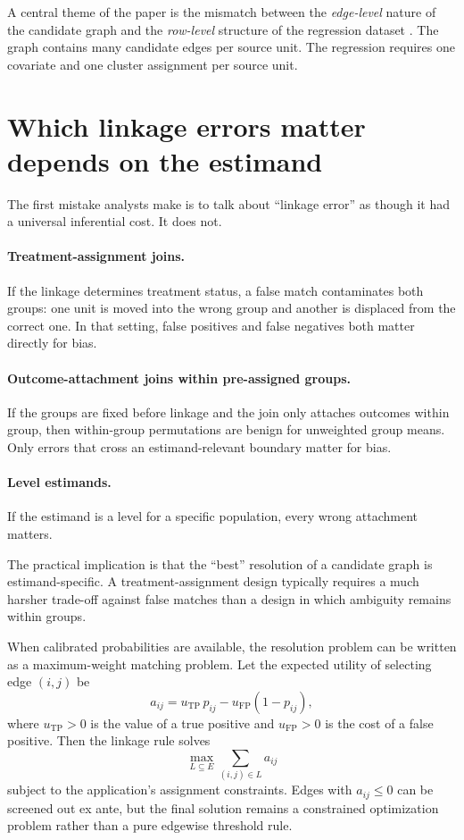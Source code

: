 \documentclass[12pt]{article}
\theoremstyle{remark}
\begin{document}
A central theme of the paper is the mismatch between the \emph{edge-level} nature of the candidate graph and the \emph{row-level} structure of the regression dataset \citep[see][for a general treatment of this mismatch]{sood2025selection}. The graph contains many candidate edges per source unit. The regression requires one covariate and one cluster assignment per source unit.

\section{Which linkage errors matter depends on the estimand}

The first mistake analysts make is to talk about ``linkage error'' as though it had a universal inferential cost. It does not.

\paragraph{Treatment-assignment joins.}
If the linkage determines treatment status, a false match contaminates both groups: one unit is moved into the wrong group and another is displaced from the correct one. In that setting, false positives and false negatives both matter directly for bias.

\paragraph{Outcome-attachment joins within pre-assigned groups.}
If the groups are fixed before linkage and the join only attaches outcomes within group, then within-group permutations are benign for unweighted group means. Only errors that cross an estimand-relevant boundary matter for bias.

\paragraph{Level estimands.}
If the estimand is a level for a specific population, every wrong attachment matters.

The practical implication is that the ``best'' resolution of a candidate graph is estimand-specific. A treatment-assignment design typically requires a much harsher trade-off against false matches than a design in which ambiguity remains within groups.

When calibrated probabilities are available, the resolution problem can be written as a maximum-weight matching problem. Let the expected utility of selecting edge $(i,j)$ be
\[
a_{ij}=u_{\mathrm{TP}}\,p_{ij}-u_{\mathrm{FP}}(1-p_{ij}),
\]
where $u_{\mathrm{TP}}>0$ is the value of a true positive and $u_{\mathrm{FP}}>0$ is the cost of a false positive. Then the linkage rule solves
\begin{equation}
\max_{L\subseteq E} \sum_{(i,j)\in L} a_{ij}
\label{eq:decision}
\end{equation}
subject to the application's assignment constraints. Edges with $a_{ij}\le 0$ can be screened out ex ante, but the final solution remains a constrained optimization problem rather than a pure edgewise threshold rule.
\end{document}
